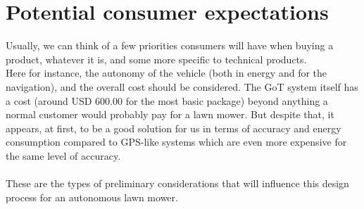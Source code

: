\section{Potential consumer expectations}
Usually, we can think of a few priorities consumers will have when buying a product, whatever it is, and some more specific to technical products.\\
Here for instance, the autonomy of the vehicle (both in energy and for the navigation), and the overall cost should be considered. The GoT system itself has a cost (around USD 600.00 for the most basic package) beyond anything a normal customer would probably pay for a lawn mower. But despite that, it appears, at first, to be a good solution for us in terms of accuracy and energy consumption compared to GPS-like systems which are even more expensive for the same level of accuracy. \\\\
These are the types of preliminary considerations that will influence this design process for an autonomous lawn mower.
